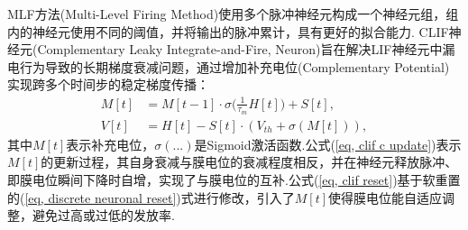 \documentclass{SCIS2020cn}
\begin{document}
MLF方法(Multi-Level Firing Method)\cite{ijcai2022p343}使用多个脉冲神经元构成一个神经元组，组内的神经元使用不同的阈值，并将输出的脉冲累计，具有更好的拟合能力.
CLIF神经元(Complementary Leaky Integrate-and-Fire, Neuron)\cite{huang2024clif}旨在解决LIF神经元中漏电行为导致的长期梯度衰减问题，通过增加补充电位(Complementary Potential)实现跨多个时间步的稳定梯度传播：
\begin{align}
M[t] &= M[t-1] \cdot \sigma\Big(\frac{1}{\tau_{m}}H[t]\Big) + S[t], \label{eq, clif c update} \\
V[t] &= H[t] - S[t] \cdot (V_{th} + \sigma(M[t])), \label{eq, clif reset}
\end{align}
其中$M[t]$表示补充电位，$\sigma(...)$是Sigmoid激活函数.公式(\ref{eq, clif c update})表示$M[t]$的更新过程，其自身衰减与膜电位的衰减程度相反，并在神经元释放脉冲、即膜电位瞬间下降时自增，实现了与膜电位的互补.公式(\ref{eq, clif reset})基于软重置的(\ref{eq, discrete neuronal reset})式进行修改，引入了$M[t]$使得膜电位能自适应调整，避免过高或过低的发放率.
\end{document}
